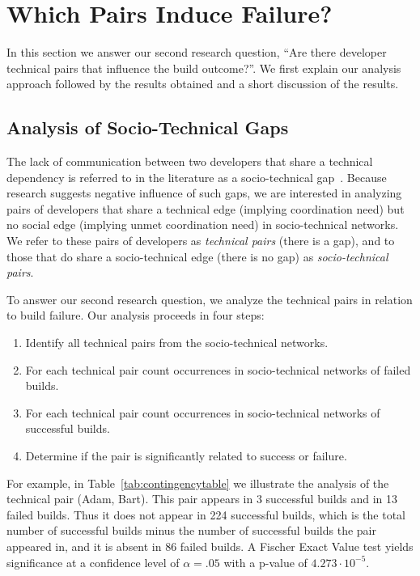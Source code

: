 \section{Which Pairs Induce Failure?}
\label{sec:pattern}
In this section we answer our second research question, ``Are there
developer technical pairs that influence the build outcome?''. 
We first explain our analysis approach followed by the results obtained and a
short discussion of the results.

\subsection{Analysis of Socio-Technical Gaps}
The lack of communication between two developers that share a
technical dependency is referred to in the literature as a
socio-technical gap~\cite{valetto:msr:2007}. Because research suggests negative influence of such gaps, we are interested in analyzing pairs of developers that share a technical edge (implying coordination need) but no social edge (implying
unmet coordination need) in socio-technical networks. We refer to these pairs of
developers as \emph{technical pairs} (there is a gap), and to those that do
share a socio-technical edge (there is no gap) as \emph{socio-technical pairs}. 

To answer our second research question, we analyze the
technical pairs in relation to build
failure. Our analysis proceeds in four steps:

\begin{enumerate}
\item Identify all technical pairs from the socio-technical networks.
\item For each technical pair count occurrences in socio-technical networks of
failed builds.
\item For each technical pair count occurrences in socio-technical networks of
successful builds.
\item Determine if the pair is significantly related to success or failure.
\end{enumerate}

For example, in Table~\ref{tab:contingencytable} we illustrate the analysis of
the technical pair (Adam, Bart). This pair appears in 3 successful builds and in
13 failed builds. Thus it does not appear in 224 successful builds, which is the total number of successful builds minus the number of successful builds the pair appeared in, and it is absent in 86 failed builds.
A Fischer Exact Value test yields significance at a confidence level of $\alpha = .05$ with a p-value of $4.273\cdot10^{-5}$.

